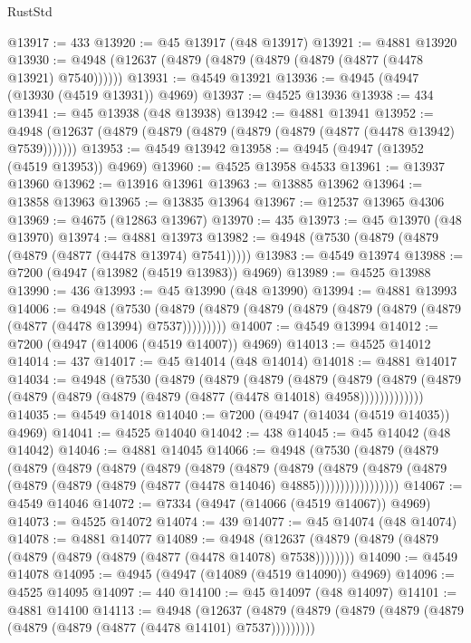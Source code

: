 \begin{lexlean}{RustStd}
\begin{coremodule}
{\begin{coremodule}
{{{{{{{{{{{{{{{{{{{{{{{{{{{{{{{{{{{{{{{{{{{{{{{{{{{{{{{{{{{{@13917 := 433
@13920 := @45 @13917 (@48 @13917)
@13921 := @4881 @13920
@13930 := @4948 (@12637 (@4879 (@4879 (@4879 (@4879 (@4877 (@4478 @13921) @7540))))))
@13931 := @4549 @13921
@13936 := @4945 (@4947 (@13930 (@4519 @13931)) @4969)
@13937 := @4525 @13936
@13938 := 434
@13941 := @45 @13938 (@48 @13938)
@13942 := @4881 @13941
@13952 := @4948 (@12637 (@4879 (@4879 (@4879 (@4879 (@4879 (@4877 (@4478 @13942) @7539)))))))
@13953 := @4549 @13942
@13958 := @4945 (@4947 (@13952 (@4519 @13953)) @4969)
@13960 := @4525 @13958 @4533
@13961 := @13937 @13960
@13962 := @13916 @13961
@13963 := @13885 @13962
@13964 := @13858 @13963
@13965 := @13835 @13964
@13967 := @12537 @13965 @4306
@13969 := @4675 (@12863 @13967)
@13970 := 435
@13973 := @45 @13970 (@48 @13970)
@13974 := @4881 @13973
@13982 := @4948 (@7530 (@4879 (@4879 (@4879 (@4877 (@4478 @13974) @7541)))))
@13983 := @4549 @13974
@13988 := @7200 (@4947 (@13982 (@4519 @13983)) @4969)
@13989 := @4525 @13988
@13990 := 436
@13993 := @45 @13990 (@48 @13990)
@13994 := @4881 @13993
@14006 := @4948
    (@7530 (@4879 (@4879 (@4879 (@4879 (@4879 (@4879 (@4879 (@4877 (@4478 @13994) @7537)))))))))
@14007 := @4549 @13994
@14012 := @7200 (@4947 (@14006 (@4519 @14007)) @4969)
@14013 := @4525 @14012
@14014 := 437
@14017 := @45 @14014 (@48 @14014)
@14018 := @4881 @14017
@14034 := @4948
    (@7530
      (@4879
        (@4879
          (@4879
            (@4879
              (@4879
                (@4879 (@4879 (@4879 (@4879 (@4879 (@4879 (@4877 (@4478 @14018) @4958)))))))))))))
@14035 := @4549 @14018
@14040 := @7200 (@4947 (@14034 (@4519 @14035)) @4969)
@14041 := @4525 @14040
@14042 := 438
@14045 := @45 @14042 (@48 @14042)
@14046 := @4881 @14045
@14066 := @4948
    (@7530
      (@4879
        (@4879
          (@4879
            (@4879
              (@4879
                (@4879
                  (@4879
                    (@4879
                      (@4879
                        (@4879
                          (@4879
                            (@4879 (@4879 (@4879 (@4879 (@4877 (@4478 @14046) @4885)))))))))))))))))
@14067 := @4549 @14046
@14072 := @7334 (@4947 (@14066 (@4519 @14067)) @4969)
@14073 := @4525 @14072
@14074 := 439
@14077 := @45 @14074 (@48 @14074)
@14078 := @4881 @14077
@14089 := @4948
    (@12637 (@4879 (@4879 (@4879 (@4879 (@4879 (@4879 (@4877 (@4478 @14078) @7538))))))))
@14090 := @4549 @14078
@14095 := @4945 (@4947 (@14089 (@4519 @14090)) @4969)
@14096 := @4525 @14095
@14097 := 440
@14100 := @45 @14097 (@48 @14097)
@14101 := @4881 @14100
@14113 := @4948
    (@12637 (@4879 (@4879 (@4879 (@4879 (@4879 (@4879 (@4879 (@4877 (@4478 @14101) @7537)))))))))
}}}}}}}}}}}}}}}}}}}}}}}}}}}}}}}}}}}}}}}}}}}}}}}}}}}}}}}}}}}}
\end{coremodule}}
\end{coremodule}
\end{lexlean}
